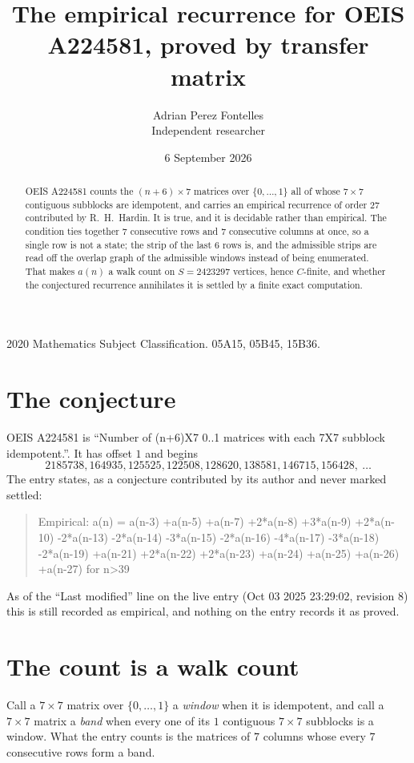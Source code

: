 \documentclass[11pt,a4paper]{article}
\title{The empirical recurrence for OEIS A224581, proved by transfer matrix}
\author{Adrian Perez Fontelles\\ \small Independent researcher}
\date{6 September 2026}
\theoremstyle{plain}
\theoremstyle{definition}
\begin{document}
\maketitle

\begin{abstract}
OEIS A224581 counts the $(n+6)\times7$ matrices over $\{0,\dots,1\}$ all of whose
$7\times7$ contiguous subblocks are idempotent, and carries an empirical recurrence of order
$27$ contributed by R.~H.~Hardin. It is true, and it is decidable rather than empirical.
The condition ties together $7$ consecutive rows and $7$ consecutive columns at once, so a
single row is not a state; the strip of the last $6$ rows is, and the admissible strips
are read off the overlap graph of the admissible windows instead of being enumerated. That
makes $a(n)$ a walk count on $S=2423297$ vertices, hence $C$-finite, and whether the conjectured
recurrence annihilates it is settled by a finite exact computation.
\end{abstract}

\noindent\small 2020 Mathematics Subject Classification. 05A15, 05B45, 15B36.\normalsize

\section{The conjecture}

OEIS A224581 is ``Number of (n+6)X7 0..1 matrices with each 7X7 subblock idempotent.''. It has offset $1$ and begins
\[
2185738, 164935, 125525, 122508, 128620, 138581, 146715, 156428,\ \dots
\]
The entry states, as a conjecture contributed by its author and never marked settled:
\begin{quote}
Empirical: a(n) = a(n-3) +a(n-5) +a(n-7) +2*a(n-8) +3*a(n-9) +2*a(n-10) -2*a(n-13) -2*a(n-14) -3*a(n-15) -2*a(n-16) -4*a(n-17) -3*a(n-18) -2*a(n-19) +a(n-21) +2*a(n-22) +2*a(n-23) +a(n-24) +a(n-25) +a(n-26) +a(n-27) for n>39
\end{quote}
As of the ``Last modified'' line on the live entry (Oct 03 2025 23:29:02, revision 8) this is still
recorded as empirical, and nothing on the entry records it as proved.

\section{The count is a walk count}

Call a $7\times7$ matrix over $\{0,\dots,1\}$ a \emph{window} when it is idempotent, and
call a $7\times7$ matrix a \emph{band} when every one of its $1$ contiguous
$7\times7$ subblocks is a window. What the entry counts is the matrices of $7$ columns
whose every $7$ consecutive rows form a band.
\end{document}
